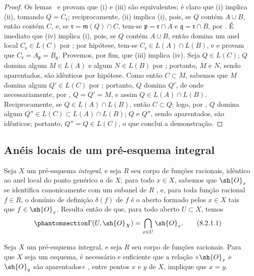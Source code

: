 \documentclass[oneside]{amsart}
\let\EGAOriginalLabel\label
\renewcommand{\label}[1]{\phantomsection\EGAOriginalLabel{#1}}
\begin{document}
\begin{proof}
Os lemas~ e  provam que (i) e (iii) são equivalentes;
é claro que (i) implica (ii), tomando $Q=C_\mathfrak{r}$;
reciprocamente, (ii) implica (i), pois, se $Q$ contém $A\cup B$, então contém $C$, e, se $\mathfrak{r}=\mathfrak{m}(Q)\cap C$, tem-se $\mathfrak{p}=\mathfrak{r}\cap A$ e $\mathfrak{q}=\mathfrak{r}\cap B$, por .
É imediato que (iv) implica (i), pois, se $Q$ contém $A\cup B$, então domina um anel local $C_\mathfrak{r}\in L(C)$ por ;
por hipótese, tem-se $C_\mathfrak{r}\in L(A)\cap L(B)$, e  e  provam que $C_\mathfrak{r}=A_\mathfrak{p}=B_\mathfrak{q}$.
Provemos, por fim, que (iii) implica (iv).
Seja $Q\in L(C)$;
$Q$ domina algum $M\in L(A)$ e algum $N\in L(B)$ por ; portanto, $M$ e $N$, sendo aparentados, são idênticos por hipótese.
Como então $C\subset M$, sabemos que $M$ domina algum $Q'\in L(C)$ por ; portanto, $Q$ domina $Q'$, de onde necessariamente, por , $Q=Q'=M$, e assim $Q\in L(A)\cap L(B)$.
Reciprocamente, se $Q\in L(A)\cap L(B)$, então $C\subset Q$; logo, por , $Q$ domina algum $Q''\in L(C)\subset L(A)\cap L(B)$;
$Q$ e $Q''$, sendo aparentados, são idênticos; portanto, $Q''=Q\in L(C)$, o que conclui a demonstração.
\end{proof}

\subsection{Anéis locais de um pré-esquema integral}
\label{subsection:I.8.2}

\begin{env}[8.2.1]
\label{I.8.2.1}
Seja $X$ um pré-esquema \emph{integral}, e seja $R$ seu corpo de funções racionais, idêntico ao anel local do ponto genérico $a$ de $X$;
para todo $x\in X$, sabemos que $\sh{O}_x$ se identifica canonicamente com um subanel de $R$ , e, para toda função racional $f\in R$, o domínio de definição $\delta(f)$ de $f$ é o aberto formado pelos $x\in X$ tais que
$f\in\sh{O}_x$.
Resulta então de  que, para todo aberto $U\subset X$, temos
\[
\label{I.8.2.1.1}
  \Gamma(U,\sh{O}_X)=\bigcap_{x\in U}\sh{O}_x.
  \tag{8.2.1.1}
\]
\end{env}

\begin{proposition}[8.2.2]
\label{I.8.2.2}
Seja $X$ um pré-esquema integral, e seja $R$ seu corpo de funções racionais. Para que $X$ seja um esquema, é necessário e suficiente que a relação «$\sh{O}_x$ e $\sh{O}_y$ são aparentados» , entre pontos $x$ e $y$ de $X$, implique que $x=y$.
\end{proposition}
\end{document}
